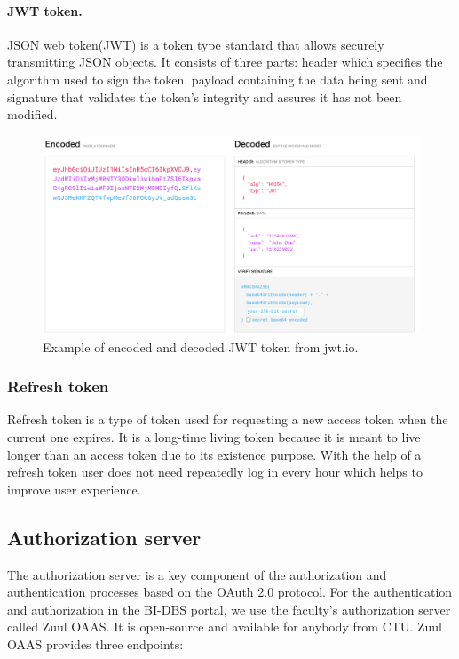 \paragraph*{JWT token.} JSON web token(JWT) is a token type standard that allows securely transmitting JSON objects. It consists of three parts: header which specifies the algorithm used to sign the token, payload containing the data being sent and signature that validates the token's integrity and assures it has not been modified. \cite{jwt-token}

\begin{figure}[hp]
\centering
\includegraphics[scale=0.31]{../png/jwt_token.png}
\caption{Example of encoded and decoded JWT token from jwt.io. \cite{jwt-token}}
\end{figure}



\subsubsection{Refresh token} Refresh token is a type of token used for requesting a new access token when the current one expires. It is a long-time living token because it is meant to live longer than an access token due to its existence purpose. With the help of a refresh token user does not need repeatedly log in every hour which helps to improve user experience. \cite{refresh-token}


\subsection{Authorization server} The authorization server is a key component of the authorization and authentication processes based on the OAuth 2.0 protocol. 
For the authentication and authorization in the BI-DBS portal, we use the faculty's authorization server called Zuul OAAS. It is open-source and available for anybody from CTU. \cite{auth-server} Zuul OAAS provides three endpoints:

